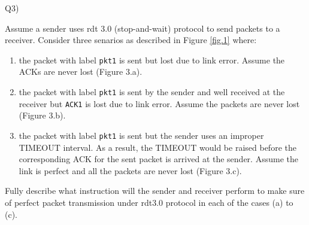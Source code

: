 \documentclass[10pt,letterpaper]{article}
\begin{document}
Q3)

Assume a sender uses rdt 3.0 (stop-and-wait) protocol to send packets to a receiver. Consider three senarios as described in Figure \ref{fig.1} where:
\begin{enumerate}[label=\alph*-]
\item
the packet with label \texttt{pkt1} is sent but lost due to link error. Assume the ACKs are never lost (Figure 3.a).
\item
the packet with label \texttt{pkt1} is sent by the sender and well received at the receiver but \texttt{ACK1} is lost due to link error. Assume the packets are never lost (Figure 3.b).
\item
the packet with label \texttt{pkt1} is sent but the sender uses an improper TIMEOUT interval. As a result, the TIMEOUT would be raised before the corresponding ACK for the sent packet is arrived at the sender. Assume the link is perfect and all the packets are never lost (Figure 3.c).
\end{enumerate}
Fully describe what instruction will the sender and receiver perform to make sure of perfect packet transmission under rdt3.0 protocol in each of the cases (a) to (c).
\end{document}
